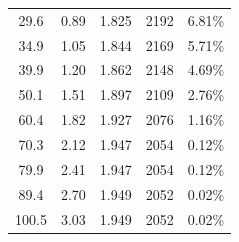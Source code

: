 \documentclass{thuemp}
\begin{document}
\begin{itemize}
\begin{table}[H]
\begin{tabular}{ccccc}
        29.6  & 0.89  & 1.825 & 2192 &  6.81\%  \\
        34.9  & 1.05  & 1.844 & 2169 &  5.71\%  \\
        39.9  & 1.20  & 1.862 & 2148 &  4.69\%  \\
        50.1  & 1.51  & 1.897 & 2109 &  2.76\%  \\
        60.4  & 1.82  & 1.927 & 2076 &  1.16\%  \\
        70.3  & 2.12  & 1.947 & 2054 &  0.12\%  \\
        79.9  & 2.41  & 1.947 & 2054 &  0.12\%  \\
        89.4  & 2.70  & 1.949 & 2052 &  0.02\%  \\
        100.5 & 3.03  & 1.949 & 2052 &  0.02\%  \\
        \bottomrule
    \end{tabular}
\end{table}




\end{itemize}
\end{document}
